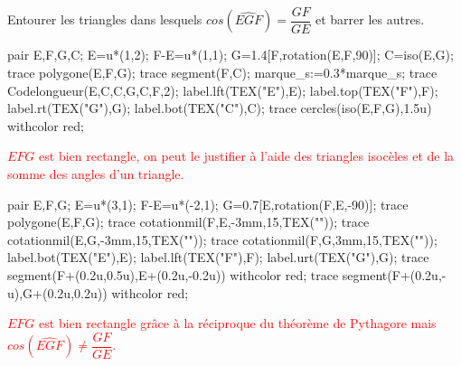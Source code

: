     Entourer les triangles dans lesquels \mbox{$cos(\widehat{EGF})=\dfrac{GF}{GE}$} et barrer les autres.

    \begin{minipage}{0.45\linewidth}
        \begin{Geometrie}
            pair E,F,G,C;
            E=u*(1,2);
            F-E=u*(1,1);
            G=1.4[F,rotation(E,F,90)];
            C=iso(E,G);
            trace polygone(E,F,G);
            trace segment(F,C);
            marque_s:=0.3*marque_s;
            trace Codelongueur(E,C,C,G,C,F,2);
            label.lft(TEX("E"),E);
            label.top(TEX("F"),F);
            label.rt(TEX("G"),G);
            label.bot(TEX("C"),C);
            trace cercles(iso(E,F,G),1.5u) withcolor red;
        \end{Geometrie}
        \textcolor{red}{$EFG$ est bien rectangle, on peut le justifier à l'aide des triangles isocèles et de la somme des angles d'un triangle.}

        \bigskip
        \begin{Geometrie}
            pair E,F,G;
            E=u*(3,1);
            F-E=u*(-2,1);
            G=0.7[E,rotation(F,E,-90)];
            trace polygone(E,F,G);
            trace cotationmil(F,E,-3mm,15,TEX(""));
            trace cotationmil(E,G,-3mm,15,TEX(""));
            trace cotationmil(F,G,3mm,15,TEX(""));
            label.bot(TEX("E"),E);
            label.lft(TEX("F"),F);
            label.urt(TEX("G"),G);
            trace segment(F+(0.2u,0.5u),E+(0.2u,-0.2u)) withcolor red;
            trace segment(F+(0.2u,-u),G+(0.2u,0.2u)) withcolor red;
        \end{Geometrie}
        \textcolor{red}{$EFG$ est bien rectangle grâce à la réciproque du théorème de Pythagore mais $cos(\widehat{EGF})\neq\dfrac{GF}{GE}$.}
    \end{minipage}
    \hfill
